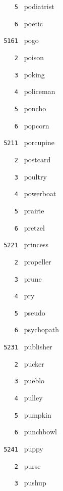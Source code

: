 \documentclass[11pt]{article}
\begin{document}
\begin{multicols}{6}
\noindent \texttt{ \ \ \ 5 } podiatrist  \par
\noindent \texttt{ \ \ \ 6 } poetic  \par
\vspace{3mm}
\noindent \texttt{ 5161 } pogo  \par
\noindent \texttt{ \ \ \ 2 } poison  \par
\noindent \texttt{ \ \ \ 3 } poking  \par
\noindent \texttt{ \ \ \ 4 } policeman  \par
\noindent \texttt{ \ \ \ 5 } poncho  \par
\noindent \texttt{ \ \ \ 6 } popcorn  \par
\noindent \texttt{ 5211 } porcupine  \par
\noindent \texttt{ \ \ \ 2 } postcard  \par
\noindent \texttt{ \ \ \ 3 } poultry  \par
\noindent \texttt{ \ \ \ 4 } powerboat  \par
\noindent \texttt{ \ \ \ 5 } prairie  \par
\noindent \texttt{ \ \ \ 6 } pretzel  \par
\vspace{3mm}
\noindent \texttt{ 5221 } princess  \par
\noindent \texttt{ \ \ \ 2 } propeller  \par
\noindent \texttt{ \ \ \ 3 } prune  \par
\noindent \texttt{ \ \ \ 4 } pry  \par
\noindent \texttt{ \ \ \ 5 } pseudo  \par
\noindent \texttt{ \ \ \ 6 } psychopath  \par
\vspace{3mm}
\noindent \texttt{ 5231 } publisher  \par
\noindent \texttt{ \ \ \ 2 } pucker  \par
\noindent \texttt{ \ \ \ 3 } pueblo  \par
\noindent \texttt{ \ \ \ 4 } pulley  \par
\noindent \texttt{ \ \ \ 5 } pumpkin  \par
\noindent \texttt{ \ \ \ 6 } punchbowl  \par
\vspace{3mm}
\noindent \texttt{ 5241 } puppy  \par
\noindent \texttt{ \ \ \ 2 } purse  \par
\noindent \texttt{ \ \ \ 3 } pushup  \par

\end{multicols}
\end{document}

